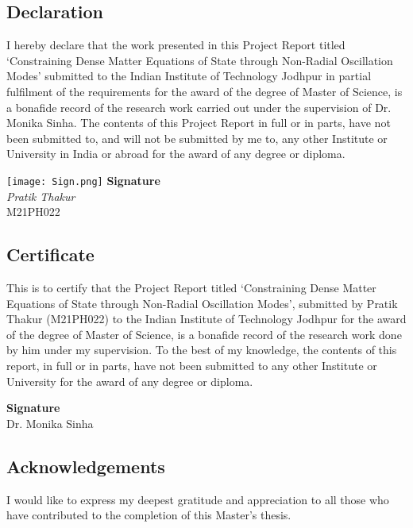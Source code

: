\documentclass[a4paper,12pt,onehalfspacing]{report}
\newcommand\emptypage{
    \newpage
    \null
    \thispagestyle{empty}
    }
\newcommand{\ttitle}{Constraining Dense Matter Equations of State through Non-Radial Oscillation Modes}
\newcommand{\supname}{Dr. Monika Sinha}
\newcommand{\degree}{Master of Science}
\newcommand{\authorname}{Pratik Thakur}
\newcommand{\rn}{M21PH022}
\begin{document}
\emptypage
{}
\setcounter{page}{2}
\begin{flushright}
    \huge{\chapter*{Declaration}}
\end{flushright}
I hereby declare that the work presented in this Project Report titled `\ttitle{}' submitted to the Indian Institute of Technology Jodhpur in partial fulfilment of the requirements for the award of the degree of \degree, is a bonafide record of the research work carried out under the supervision of \supname. The contents of this Project Report in full or in parts, have not been submitted to, and will not be submitted by me to, any other Institute or University in India or abroad for the award of any degree or diploma.
\vspace{1cm}
\begin{flushright} 
    \texttt{[image: Sign.png]}
    \large{\textbf{Signature}}\\
    \emph{\authorname}\\
\rn
\end{flushright}
\emptypage
\begin{flushright}
    \huge{\chapter*{Certificate}}
\end{flushright}
This is to certify that the Project Report titled `\ttitle', submitted by \authorname{} (\rn{}) to the Indian Institute of Technology Jodhpur for the award of the degree of \degree{}, is a bonafide record of the research work done by him under my supervision. To the best of my knowledge, the contents of this report, in full or in parts, have not been submitted to any other Institute or University for the award of any degree or diploma.
\vspace{3cm}
\begin{flushright}
\large{\textbf{Signature}}\\
\supname\\
\end{flushright}

\emptypage
\begin{flushright}
    \huge{\chapter*{Acknowledgements}}
\end{flushright}
I would like to express my deepest gratitude and appreciation to all those who have contributed to the completion of this Master's thesis.
\end{document}
